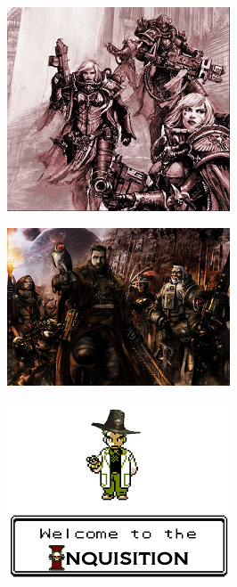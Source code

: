 \begin{figure}
	\begin{center}
		\includegraphics[width=\figwidth]{pics/6/52.png}
	\end{center}
\end{figure}

\begin{figure}
	\begin{center}
		\includegraphics[width=\figwidth]{pics/6/53.png}
	\end{center}
\end{figure}

\begin{figure}
	\begin{center}
		\includegraphics[width=\figwidth]{pics/6/54.png}
	\end{center}
\end{figure}

